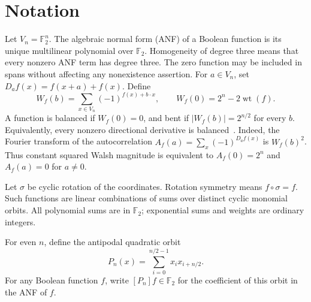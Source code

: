 \documentclass[11pt,a4paper]{article}
\newcommand{\F}{\mathbb F_2}
\newcommand{\wt}{\operatorname{wt}}
\begin{document}
\section{Notation}
Let $V_n=\F^n$. The algebraic normal form (ANF) of a Boolean function is its unique multilinear polynomial over $\F$. Homogeneity of degree three means that every nonzero ANF term has degree three. The zero function may be included in spans without affecting any nonexistence assertion.
For $a\in V_n$, set $D_a f(x)=f(x+a)+f(x)$. Define
\[
 W_f(b)=\sum_{x\in V_n}(-1)^{f(x)+b\cdot x},\qquad
 W_f(0)=2^n-2\wt(f).
\]
A function is balanced if $W_f(0)=0$, and bent if $|W_f(b)|=2^{n/2}$ for every $b$. Equivalently, every nonzero directional derivative is balanced~\cite{rothaus}. Indeed, the Fourier transform of the autocorrelation $A_f(a)=\sum_x(-1)^{D_af(x)}$ is $W_f(b)^2$. Thus constant squared Walsh magnitude is equivalent to $A_f(0)=2^n$ and $A_f(a)=0$ for $a\ne0$.

Let $\sigma$ be cyclic rotation of the coordinates. Rotation symmetry means $f\circ\sigma=f$. Such functions are linear combinations of sums over distinct cyclic monomial orbits. All polynomial sums are in $\F$; exponential sums and weights are ordinary integers.

For even $n$, define the antipodal quadratic orbit
\[
P_n(x)=\sum_{i=0}^{n/2-1}x_i x_{i+n/2}.
\]
For any Boolean function $f$, write $[P_n]f\in\F$ for the coefficient of this orbit in the ANF of $f$.
\end{document}
